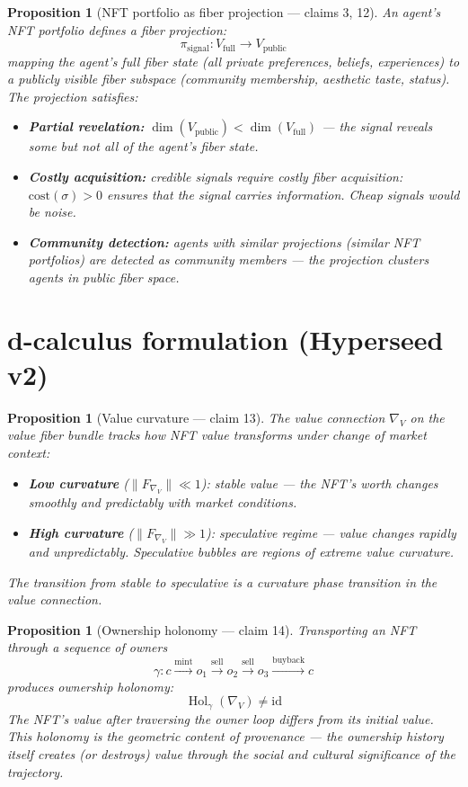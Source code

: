 \documentclass[11pt,a4paper]{article}
\newtheorem{proposition}[definition]{Proposition}
\begin{document}
\begin{proposition}[NFT portfolio as fiber projection --- claims 3, 12]
\label{prop:signaling}
An agent's NFT portfolio defines a fiber projection:
\[
  \pi_{\text{signal}}: V_{\text{full}} \to V_{\text{public}}
\]
mapping the agent's full fiber state (all private preferences, beliefs,
experiences) to a publicly visible fiber subspace (community membership,
aesthetic taste, status). The projection satisfies:
\begin{itemize}
  \item \textbf{Partial revelation:} $\dim(V_{\text{public}}) < \dim(V_{\text{full}})$
    --- the signal reveals some but not all of the agent's fiber state.
  \item \textbf{Costly acquisition:} credible signals require costly
    fiber acquisition: $\text{cost}(\sigma) > 0$ ensures that the signal
    carries information. Cheap signals would be noise.
  \item \textbf{Community detection:} agents with similar projections
    (similar NFT portfolios) are detected as community members ---
    the projection clusters agents in public fiber space.
\end{itemize}
\end{proposition}

\section{d-calculus formulation (Hyperseed v2)}

\begin{proposition}[Value curvature --- claim 13]
\label{prop:curvature}
The \emph{value connection} $\nabla_V$ on the value fiber bundle tracks
how NFT value transforms under change of market context:
\begin{itemize}
  \item \textbf{Low curvature} ($\|F_{\nabla_V}\| \ll 1$): stable value ---
    the NFT's worth changes smoothly and predictably with market conditions.
  \item \textbf{High curvature} ($\|F_{\nabla_V}\| \gg 1$): speculative
    regime --- value changes rapidly and unpredictably. Speculative
    bubbles are regions of extreme value curvature.
\end{itemize}
The transition from stable to speculative is a curvature phase transition
in the value connection.
\end{proposition}

\begin{proposition}[Ownership holonomy --- claim 14]
\label{prop:holonomy}
Transporting an NFT through a sequence of owners
\[
  \gamma: c \xrightarrow{\text{mint}} o_1
    \xrightarrow{\text{sell}} o_2
    \xrightarrow{\text{sell}} o_3
    \xrightarrow{\text{buyback}} c
\]
produces ownership holonomy:
\[
  \operatorname{Hol}_\gamma(\nabla_V) \neq \mathrm{id}
\]
The NFT's value after traversing the owner loop differs from its initial
value. This holonomy is the \emph{geometric content of provenance} ---
the ownership history itself creates (or destroys) value through the
social and cultural significance of the trajectory.
\end{proposition}
\end{document}
